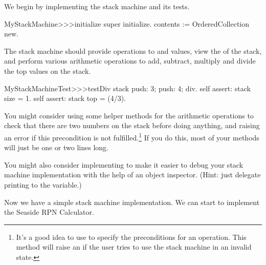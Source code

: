 \documentclass[a4paper,10pt,twoside]{book}
\begin{document}
We begin by implementing the stack machine and its tests.


\begin{code}{}
MyStackMachine>>>initialize
	super initialize.
	contents := OrderedCollection new.
\end{code}

The stack machine should provide operations to  and  values, view the  of the stack, and perform various arithmetic operations to add, subtract, multiply and divide the top values on the stack.


\begin{code}{}
MyStackMachineTest>>>testDiv
	stack
		push: 3;
		push: 4;
		div.
	self assert: stack size = 1.
	self assert: stack top = (4/3).
\end{code}

You might consider using some helper methods for the arithmetic operations to check that there are two numbers on the stack before doing anything, and raising an error if this precondition is not fulfilled.\footnote{It's a good idea to use  to specify the preconditions for an operation.
This method will raise an  if the user tries to use the stack machine in an invalid state.}
If you do this, most  of your methods will just be one or two lines long.

You might also consider implementing  to make it easier to debug your stack machine implementation with the help of an object inspector.
(Hint: just delegate printing to the  variable.)


Now we have a simple stack machine implementation.
We can start to implement the Seaside RPN Calculator.
\end{document}
